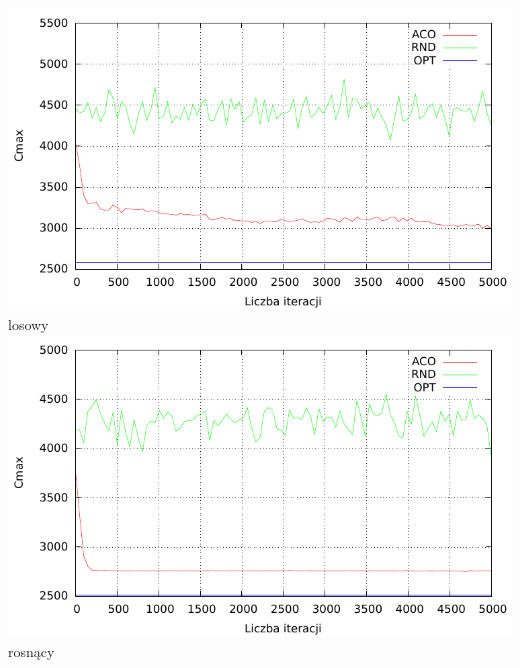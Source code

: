 \documentclass[10pt,a4paper]{article}
\begin{document}
\begin{center}
\includegraphics{./figures/inst01_rnd_smooth.pdf}
\vspace{2 mm}
\\losowy
\\
\vspace{5mm}
\includegraphics{./figures/inst02_asc_smooth.pdf}
\vspace{2 mm}
\\rosnący


\end{center}
\end{document}
